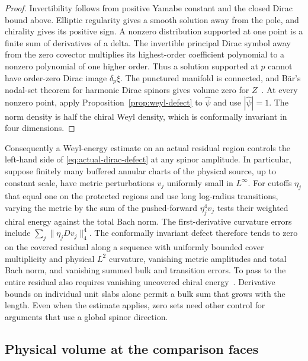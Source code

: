 \documentclass[11pt]{article}
\numberwithin{equation}{section}
\begin{document}
\begin{proof}
Invertibility follows from positive Yamabe constant and the closed
Dirac bound above. Elliptic regularity gives a smooth solution away
from the pole, and chirality gives its positive sign. A nonzero
distribution supported at one point is a finite sum of derivatives
of a delta. The invertible principal Dirac symbol away from the
zero covector multiplies its highest-order coefficient polynomial
to a nonzero polynomial of one higher order. Thus a solution
supported at \(p\) cannot have order-zero Dirac image
\(\delta_p\xi\). The punctured manifold is connected, and B\"ar's
nodal-set theorem for harmonic Dirac spinors gives volume zero for
\(Z\)~\cite[Main Theorem]{Baer1997Nodal}. At every nonzero point,
apply Proposition~\ref{prop:weyl-defect} to \(\widehat\psi\)
and use \(|\widehat\psi|=1\). The norm density is half the chiral
Weyl density, which is conformally invariant in four dimensions.
\end{proof}

Consequently a Weyl-energy estimate on an actual residual region
controls the left-hand side of \eqref{eq:actual-dirac-defect} at any
spinor amplitude. In particular, suppose finitely many buffered
annular charts of the physical source, up to constant scale, have
metric perturbations \(v_j\) uniformly small in \(L^\infty\).
For cutoffs \(\eta_j\) that equal one on the protected regions and
use long log-radius transitions, varying the metric by the sum of
the pushed-forward \(\eta_j^4v_j\) tests their weighted chiral
energy against the total Bach norm. The first-derivative curvature
errors include \(\sum_j\|\eta_j Dv_j\|_4^4\). The conformally
invariant defect therefore tends to zero on the covered residual
along a sequence with uniformly bounded cover multiplicity and
physical \(L^2\) curvature, vanishing metric amplitudes and total
Bach norm, and vanishing summed bulk and transition errors.
To pass to the entire residual also requires vanishing uncovered
chiral energy~\cite{Baker2026TwistorSections,Baker2026DiracTransmission}.
Derivative bounds on individual unit slabs alone permit a bulk
sum that grows with the length. Even when the estimate applies,
zero sets need other control for arguments that use a global
spinor direction.

\subsection{Physical volume at the comparison faces}
\end{document}
